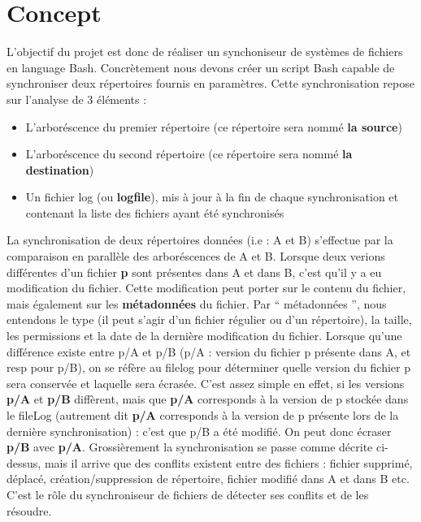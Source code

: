 \documentclass[a4paper,12pt]{report}
\begin{document}
		\section{Concept}
			\begin{onehalfspace}
				L'objectif du projet est donc de réaliser un synchoniseur de systèmes de fichiers en language Bash. Concrètement nous devons créer un script Bash capable de synchroniser deux répertoires fournis en paramètres. Cette synchronisation repose sur l'analyse de 3 éléments :
				\begin{itemize}
					\item L'arboréscence du premier répertoire (ce répertoire sera nommé \textbf{la source})
					\item L'arboréscence du second répertoire (ce répertoire sera nommé \textbf{la destination})
					\item Un fichier log (ou \textbf{logfile}), mis à jour à la fin de chaque synchronisation et contenant la liste des fichiers ayant été synchronisés
				\end{itemize}

				\vspace{0.5cm}

				La synchronisation de deux répertoires données (i.e : A et B) s'effectue par la comparaison en parallèle des arboréscences de A et B. Lorsque deux verions différentes d'un fichier \textbf{p} sont présentes dans A et dans B, c'est qu'il y a eu modification du fichier. Cette modification peut porter sur le contenu du fichier, mais également sur les \textbf{métadonnées} du fichier. Par “ métadonnées ”, nous entendons le type (il peut s'agir d'un fichier régulier ou d'un répertoire), la taille, les permissions et la date de la dernière modification du fichier. Lorsque qu'une différence existe entre p/A et p/B (p/A : version du fichier p présente dans A, et resp pour p/B), on se réfère au filelog pour déterminer quelle version du fichier p sera conservée et laquelle sera écrasée. C'est assez simple en effet, si les versions \textbf{p/A} et \textbf{p/B} diffèrent, mais que \textbf{p/A} corresponds à la version de p stockée dans le fileLog (autrement dit \textbf{p/A} corresponds à la version de p présente lors de la dernière synchronisation) : c'est que p/B a été modifié. On peut donc écraser \textbf{p/B} avec \textbf{p/A}.
				Grossièrement la synchronisation se passe comme décrite ci-dessus, mais il arrive que des conflits existent entre des fichiers : fichier supprimé, déplacé, création/suppression de répertoire, fichier modifié dans A et dans B etc. C'est le rôle du synchroniseur de fichiers de détecter ses conflits et de les résoudre.
			\end{onehalfspace}
\end{document}
